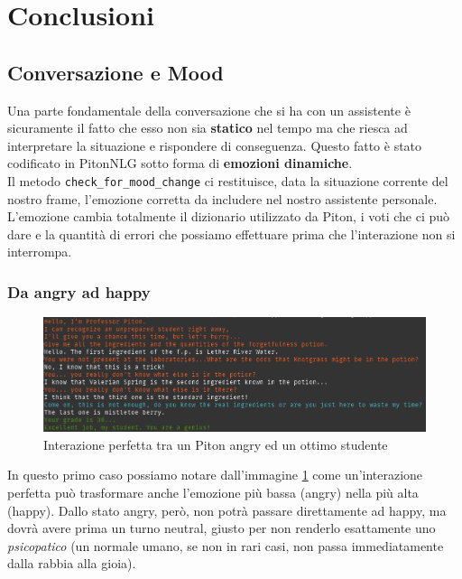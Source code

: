 \section{Conclusioni}
\subsection{Conversazione e Mood}
Una parte fondamentale della conversazione che si ha con un assistente è sicuramente il fatto che esso non sia \textbf{statico} nel tempo ma che riesca ad interpretare la situazione e rispondere di conseguenza.
Questo fatto è stato codificato in PitonNLG sotto forma di \textbf{emozioni dinamiche}.
\\
Il metodo \texttt{check\_for\_mood\_change} ci restituisce, data la situazione corrente del nostro frame, l'emozione corretta da includere nel nostro assistente personale. L'emozione cambia totalmente il dizionario utilizzato da Piton, i voti che ci può dare e la quantità di errori che possiamo effettuare prima che l'interazione non si interrompa.
\subsubsection{Da angry ad happy}
\begin{figure}[!htb]
    \centering
    \includegraphics[scale=0.45]{Images/from_angry_to_happy.png}
    \caption{Interazione perfetta tra un Piton angry ed un ottimo studente}
    \label{fig:from_angry_to_happy}
\end{figure}
In questo primo caso possiamo notare dall'immagine \ref{fig:from_angry_to_happy} come un'interazione perfetta può trasformare anche l'emozione più bassa (angry) nella più alta (happy). Dallo stato angry, però, non potrà passare direttamente ad happy, ma dovrà avere prima un turno neutral, giusto per non renderlo esattamente uno \textit{psicopatico} (un normale umano, se non in rari casi, non passa immediatamente dalla rabbia alla gioia). 
